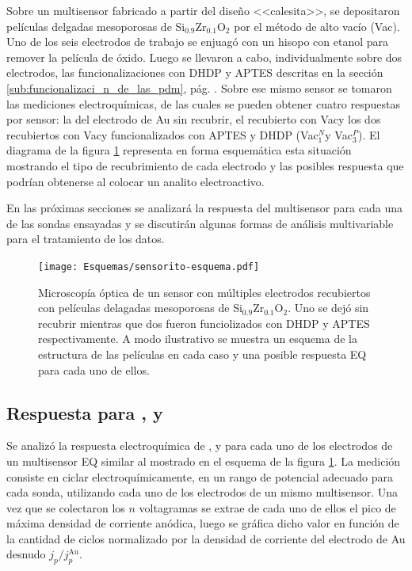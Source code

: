 	Sobre un multisensor fabricado a partir del diseño <<calesita>>, se depositaron películas delgadas mesoporosas de Si$_{0.9}$Zr$_{0.1}$O$_2$ por el método de alto vacío (Vac\pdmZ). Uno de los seis electrodos de trabajo se enjuagó con un hisopo con etanol para remover la película de óxido. Luego se llevaron a cabo, individualmente sobre dos electrodos, las funcionalizaciones con DHDP y APTES descritas en la sección \ref{sub:funcionalizaci_n_de_las_pdm}, pág. \pageref{sub:funcionalizaci_n_de_las_pdm}. Sobre ese mismo sensor se tomaron las mediciones electroquímicas, de las cuales se pueden obtener cuatro respuestas por sensor: la del electrodo de Au sin recubrir, el recubierto con Vac\pdmZ\space y los dos recubiertos con Vac\pdmZ\space y funcionalizados con APTES y DHDP (Vac\pdmZ$^N_1$\space y  Vac\pdmZ$^P_3$). El diagrama de la figura \ref{fig:sensor-calesita} representa en forma esquemática esta situación mostrando el tipo de recubrimiento de cada electrodo y las posibles respuesta que podrían obtenerse al colocar un analito electroactivo. 

	En las próximas secciones se analizará la respuesta del multisensor para cada una de las sondas ensayadas y se discutirán algunas formas de análisis multivariable para el tratamiento de los datos. 


			\begin{figure}[h!]
		 	       	\begin{center}
		 	       	\texttt{[image: Esquemas/sensorito-esquema.pdf]}
		        	\caption[Esquema de sensores EQ selectivos]{Microscopía óptica de un sensor con múltiples electrodos recubiertos con películas delagadas mesoporosas de Si$_{0.9}$Zr$_{0.1}$O$_2$. Uno se dejó sin recubrir mientras que dos fueron funciolizados con DHDP y APTES respectivamente. A modo ilustrativo se muestra un esquema de la estructura de las películas en cada caso y una posible respuesta EQ para cada uno de ellos.}
		         	\label{fig:sensor-calesita}
		         	\end{center}
		     		\end{figure}

	\subsection{Respuesta para \ru, \fe\space y \fc}	

		Se analizó la respuesta electroquímica de \aminorutenio, \ferroferri\space y \ferroceno\space para cada uno de los electrodos de un multisensor EQ similar al mostrado en el esquema de la figura \ref{fig:sensor-calesita}. La medición consiste en ciclar electroquímicamente, en un rango de potencial adecuado para cada sonda, utilizando cada uno de los electrodos de un mismo multisensor. Una vez que se colectaron los $n$ voltagramas se extrae de cada uno de ellos el pico de máxima densidad de corriente anódica, luego se gráfica dicho valor en función de la cantidad de ciclos normalizado por la densidad de corriente del electrodo de Au desnudo $j_p/j_p^\text{Au}$.

